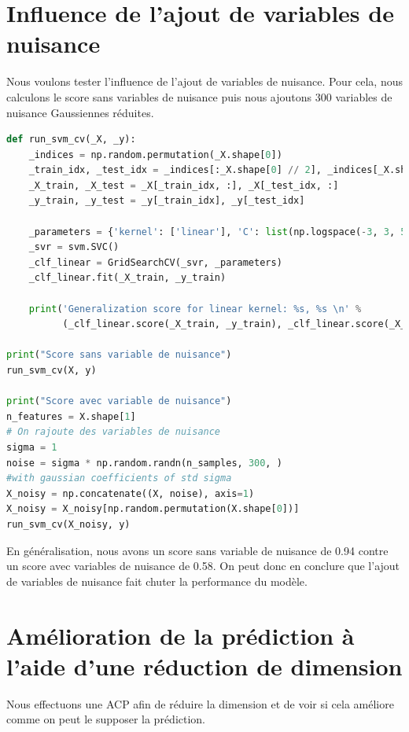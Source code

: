 \documentclass{book}
\begin{document}
\section{Influence de l'ajout de variables de nuisance}

Nous voulons tester l'influence de l'ajout de variables de nuisance. Pour cela, nous calculons le score sans variables de nuisance puis nous ajoutons 300 variables de nuisance Gaussiennes réduites.

\begin{lstlisting}[language=Python, caption=Programme de calcul de l'influence de l'ajout de variables de nuisance]
def run_svm_cv(_X, _y):
    _indices = np.random.permutation(_X.shape[0])
    _train_idx, _test_idx = _indices[:_X.shape[0] // 2], _indices[_X.shape[0] // 2:]
    _X_train, _X_test = _X[_train_idx, :], _X[_test_idx, :]
    _y_train, _y_test = _y[_train_idx], _y[_test_idx]

    _parameters = {'kernel': ['linear'], 'C': list(np.logspace(-3, 3, 5))}
    _svr = svm.SVC()
    _clf_linear = GridSearchCV(_svr, _parameters)
    _clf_linear.fit(_X_train, _y_train)

    print('Generalization score for linear kernel: %s, %s \n' %
          (_clf_linear.score(_X_train, _y_train), _clf_linear.score(_X_test, _y_test)))

print("Score sans variable de nuisance")
run_svm_cv(X, y)

print("Score avec variable de nuisance")
n_features = X.shape[1]
# On rajoute des variables de nuisance
sigma = 1
noise = sigma * np.random.randn(n_samples, 300, ) 
#with gaussian coefficients of std sigma
X_noisy = np.concatenate((X, noise), axis=1)
X_noisy = X_noisy[np.random.permutation(X.shape[0])]
run_svm_cv(X_noisy, y)
\end{lstlisting}

En généralisation, nous avons un score sans variable de nuisance de 0.94 contre un score avec variables de nuisance de 0.58. On peut donc en conclure que l'ajout de variables de nuisance fait chuter la performance du modèle.

\section{Amélioration de la prédiction à l'aide d'une réduction de dimension}

Nous effectuons une ACP afin de réduire la dimension et de voir si cela améliore comme on peut le supposer la prédiction.
\end{document}
